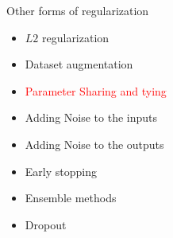 \begin{frame}
\end{frame}

\begin{frame}
	\vspace{4em}
	\begin{overlayarea}{\textwidth}{\textheight}
		\begin{block}{Other forms of regularization}
			\begin{itemize}
				\item $L2$ regularization
				\item Dataset augmentation
				\item \textcolor<2->{red}{Parameter Sharing and tying}
				\item Adding Noise to the inputs 
				\item Adding Noise to the outputs 
				\item Early stopping
				\item Ensemble methods
				\item Dropout
			\end{itemize}
		\end{block}
	\end{overlayarea}
\end{frame}
		

